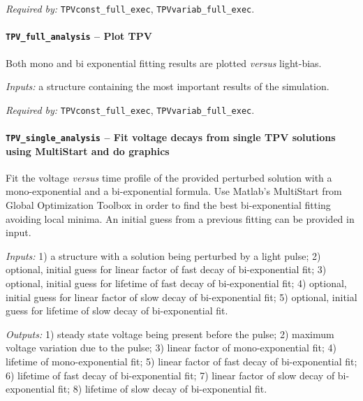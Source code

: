 		\textit{Required by:} \texttt{TPV\-const\_full\_exec}, \texttt{TPV\-variab\_full\_exec}.
		
		

		
		
		\paragraph{\texttt{TPV\_full\_analysis} -- Plot TPV}
			Both mono and bi exponential fitting results are plotted \textsl{versus} light-bias.
			
				\textit{Inputs:} a structure containing the most important results of the  simulation.
		
		
		
		\textit{Required by:} \texttt{TPV\-const\_full\_exec}, \texttt{TPV\-variab\_full\_exec}.
		
		\paragraph{\texttt{TPV\_single\_analysis} -- Fit voltage decays from single TPV solutions using MultiStart and do graphics}
		Fit the voltage \textsl{versus} time profile of the provided perturbed solution with a mono\hyp{}exponential and a bi\hyp{}exponential formula.
		Use Matlab's MultiStart from Global Optimization Toolbox in order to find the best bi\hyp{}exponential fitting avoiding local minima.
		An initial guess from a previous fitting can be provided in input.
		
		\textit{Inputs:} 1) a structure with a solution being perturbed by a light pulse;
		2) optional, initial guess for linear factor of fast decay of bi-exponential fit;
		3) optional, initial guess for lifetime of fast decay of bi-exponential fit;
		4) optional, initial guess for linear factor of slow decay of bi-exponential fit;
		5) optional, initial guess for lifetime of slow decay of bi-exponential fit.
		
		\textit{Outputs:} 1) steady state voltage being present before the pulse;
		   2) maximum voltage variation due to the pulse;
		   3) linear factor of mono-exponential fit;
		   4) lifetime of mono-exponential fit;
		   5) linear factor of fast decay of bi-exponential fit;
		   6) lifetime of fast decay of bi-exponential fit;
		   7) linear factor of slow decay of bi-exponential fit;
		   8) lifetime of slow decay of bi-exponential fit.
		
